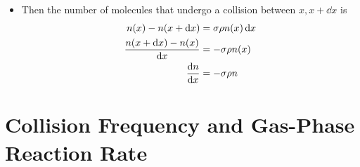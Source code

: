 \documentclass[../notes.tex]{subfiles}
\begin{document}
\begin{itemize}
\begin{itemize}
        \item Then the number of molecules that undergo a collision between $x,x+\dd{x}$ is
        \begin{align*}
            n(x)-n(x+\dd{x}) &= \sigma\rho n(x)\dd{x}\\
            \frac{n(x+\dd{x})-n(x)}{\dd{x}} &= -\sigma\rho n(x)\\
            \dv{n}{x} &= -\sigma\rho n
        \end{align*}
    \end{itemize}
\end{itemize}



\section{Collision Frequency and Gas-Phase Reaction Rate}
\end{document}

